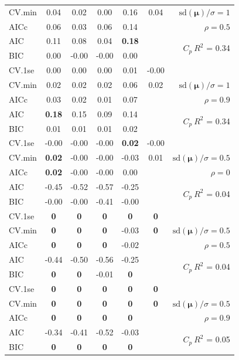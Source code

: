 \documentclass[12pt]{article}
\newcommand{\mr}[1]{\mathrm{#1}}
\newcommand{\bm}[1]{\mathbf{#1}}
\begin{document}
\begin{table}[p]
\begin{center}
\begin{tabular}{l*{5}{c}|r}
CV.min & 0.04 & 0.02 & 0.00 & 0.16 & 0.04 &  $\mr{sd}(\bm{\mu})/\sigma=1$ \\
AICc & 0.06 & 0.03 & 0.06 & 0.14 & & $\rho=0.5$ \\
AIC & 0.11 & 0.08 & 0.04 & {\bf 0.18} & & \multirow{2}{*}{$C_p ~ R^2$ = 0.34} \\
BIC & 0.00 & -0.00 & -0.00 & 0.00 & & \\
 \hline 
CV.1se & 0.00 & 0.00 & 0.00 & 0.01 & -0.00 &\\
CV.min & 0.02 & 0.02 & 0.02 & 0.06 & 0.02 &  $\mr{sd}(\bm{\mu})/\sigma=1$ \\
AICc & 0.03 & 0.02 & 0.01 & 0.07 & & $\rho=0.9$ \\
AIC & {\bf 0.18} & 0.15 & 0.09 & 0.14 & & \multirow{2}{*}{$C_p ~ R^2$ = 0.34} \\
BIC & 0.01 & 0.01 & 0.01 & 0.02 & & \\
 \hline 
CV.1se & -0.00 & -0.00 & -0.00 & {\bf 0.02} & -0.00 &\\
CV.min & {\bf 0.02} & -0.00 & -0.00 & -0.03 & 0.01 &  $\mr{sd}(\bm{\mu})/\sigma=0.5$ \\
AICc & {\bf 0.02} & -0.00 & -0.00 & 0.00 & & $\rho=0$ \\
AIC & -0.45 & -0.52 & -0.57 & -0.25 & & \multirow{2}{*}{$C_p ~ R^2$ = 0.04} \\
BIC & -0.00 & -0.00 & -0.41 & -0.00 & & \\
 \hline 
CV.1se & {\bf 0} & {\bf 0} & {\bf 0} & {\bf 0} & {\bf 0} &\\
CV.min & {\bf 0} & {\bf 0} & {\bf 0} & -0.03 & {\bf 0} &  $\mr{sd}(\bm{\mu})/\sigma=0.5$ \\
AICc & {\bf 0} & {\bf 0} & {\bf 0} & -0.02 & & $\rho=0.5$ \\
AIC & -0.44 & -0.50 & -0.56 & -0.25 & & \multirow{2}{*}{$C_p ~ R^2$ = 0.04} \\
BIC & {\bf 0} & {\bf 0} & -0.01 & {\bf 0} & & \\
 \hline 
CV.1se & {\bf 0} & {\bf 0} & {\bf 0} & {\bf 0} & {\bf 0} &\\
CV.min & {\bf 0} & {\bf 0} & {\bf 0} & {\bf 0} & {\bf 0} &  $\mr{sd}(\bm{\mu})/\sigma=0.5$ \\
AICc & {\bf 0} & {\bf 0} & {\bf 0} & {\bf 0} & & $\rho=0.9$ \\
AIC & -0.34 & -0.41 & -0.52 & -0.03 & & \multirow{2}{*}{$C_p ~ R^2$ = 0.05} \\
BIC & {\bf 0} & {\bf 0} & {\bf 0} & {\bf 0} & & \\
 \hline 
\end{tabular}
\end{center}
\vspace{-1cm}
\end{table}
\end{document}

